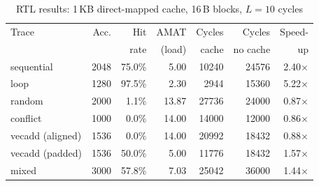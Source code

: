 \begin{table}[!t]
\centering
\caption{RTL results: 1\,KB direct-mapped cache, 16\,B blocks, $L=10$ cycles}
\label{tab:results}
\setlength{\tabcolsep}{3pt}
\begin{tabular}{lrrrrrr}
\hline
Trace & Acc. & Hit & AMAT & Cycles & Cycles & Speed- \\
 & & rate & (load) & cache & no cache & up \\
\hline
sequential & 2048 & 75.0\% & 5.00 & 10240 & 24576 & 2.40$\times$ \\
loop & 1280 & 97.5\% & 2.30 & 2944 & 15360 & 5.22$\times$ \\
random & 2000 & 1.1\% & 13.87 & 27736 & 24000 & 0.87$\times$ \\
conflict & 1000 & 0.0\% & 14.00 & 14000 & 12000 & 0.86$\times$ \\
vecadd (aligned) & 1536 & 0.0\% & 14.00 & 20992 & 18432 & 0.88$\times$ \\
vecadd (padded) & 1536 & 50.0\% & 5.00 & 11776 & 18432 & 1.57$\times$ \\
mixed & 3000 & 57.8\% & 7.03 & 25042 & 36000 & 1.44$\times$ \\
\hline
\end{tabular}
\end{table}
